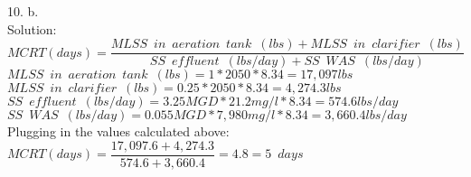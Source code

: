 \vspace{0.3cm}
10.	b.  \\
\vspace{0.3cm}
Solution:\\
\vspace{0.3cm}
$MCRT (days) =  \dfrac{MLSS \enspace in \enspace aeration \enspace tank \enspace (lbs)+MLSS \enspace in \enspace clarifier \enspace (lbs)}{SS \enspace effluent \enspace (lbs/day)+SS \enspace WAS \enspace (lbs/day)}$\\
\vspace{0.3cm} 
$MLSS \enspace in \enspace aeration \enspace tank \enspace (lbs)=1*2050*8.34=17,097lbs$\\
\vspace{0.3cm} 
$MLSS \enspace in \enspace clarifier \enspace (lbs)=0.25*2050*8.34=4,274.3lbs$\\
\vspace{0.3cm} 
$SS \enspace effluent \enspace (lbs/day)=3.25MGD *21.2mg/l*8.34=574.6 lbs/day$\\
\vspace{0.3cm} 
$SS \enspace WAS \enspace (lbs/day)=0.055MGD *7,980mg/l*8.34=3,660.4lbs/day$\\
\vspace{0.3cm} 
Plugging in the values calculated above: $MCRT (days) =  \dfrac{17,097.6+4,274.3}{574.6+3,660.4}=4.8=\boxed{5 \enspace days}$\\
\vspace{0.2cm}




